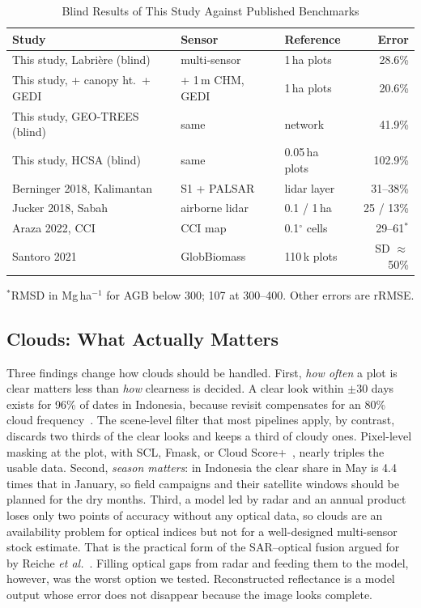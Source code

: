 \documentclass[conference,a4paper]{IEEEtran}
\begin{document}
\begin{table}[t]
\centering
\caption{Blind Results of This Study Against Published Benchmarks}
\label{tab:bench}
\footnotesize
\setlength{\tabcolsep}{2pt}
\scriptsize
\begin{tabularx}{\columnwidth}{@{}X l l r@{}}
\toprule
\textbf{Study} & \textbf{Sensor} & \textbf{Reference} & \textbf{Error}\\
\midrule
This study, Labri\`ere (blind) & multi-sensor & 1\,ha plots & 28.6\%\\
This study, + canopy ht.\ + GEDI & + 1\,m CHM, GEDI & 1\,ha plots & 20.6\%\\
This study, GEO-TREES (blind) & same & network & 41.9\%\\
This study, HCSA (blind) & same & 0.05\,ha plots & 102.9\%\\
Berninger 2018, Kalimantan~\cite{berninger2018sar} & S1 + PALSAR & lidar layer & 31--38\%\\
Jucker 2018, Sabah~\cite{jucker2018estimating} & airborne lidar & 0.1 / 1\,ha & 25 / 13\%\\
Araza 2022, CCI~\cite{araza2022comprehensive} & CCI map & 0.1$^\circ$ cells & 29--61$^\ast$\\
Santoro 2021~\cite{santoro2021global} & GlobBiomass & 110\,k plots & SD $\approx$50\%\\
\bottomrule
\end{tabularx}

\vspace{2pt}
{\scriptsize $^\ast$RMSD in Mg\,ha$^{-1}$ for AGB below 300; 107 at 300--400. Other errors are rRMSE.\par}
\end{table}

\subsection{Clouds: What Actually Matters}
Three findings change how clouds should be handled. First, \emph{how often} a plot is clear matters less than \emph{how} clearness is decided. A clear look within $\pm$30 days exists for 96\% of dates in Indonesia, because revisit compensates for an 80\% cloud frequency~\cite{wilson2016cloud,li2017revisit}. The scene-level filter that most pipelines apply, by contrast, discards two thirds of the clear looks and keeps a third of cloudy ones. Pixel-level masking at the plot, with SCL, Fmask, or Cloud Score+~\cite{zhu2012fmask,skakun2022cmix,pasquarella2023cloudscore}, nearly triples the usable data. Second, \emph{season matters}: in Indonesia the clear share in May is 4.4 times that in January, so field campaigns and their satellite windows should be planned for the dry months. Third, a model led by radar and an annual product loses only two points of accuracy without any optical data, so clouds are an availability problem for optical indices but not for a well-designed multi-sensor stock estimate. That is the practical form of the SAR--optical fusion argued for by Reiche \textit{et al.}~\cite{reiche2016combining}. Filling optical gaps from radar and feeding them to the model, however, was the worst option we tested. Reconstructed reflectance is a model output whose error does not disappear because the image looks complete.
\end{document}
